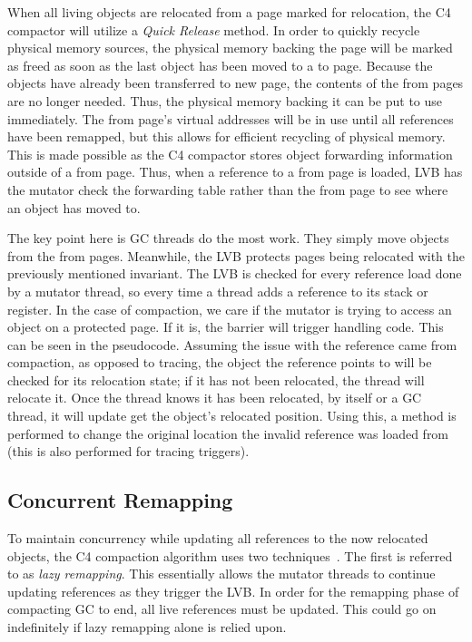 \documentclass{sig-alternate}
\begin{document}
When all living objects are relocated from a page marked for relocation,
the C4 compactor will utilize a \emph{Quick Release} method. In order to quickly recycle
physical memory sources, the physical memory backing the page will be marked as freed
as soon as the last object has been moved to a to page. Because the objects have already 
been transferred to new page, the contents of the from pages are no longer needed. Thus,
the physical memory backing it can be put to use immediately. The from page's virtual 
addresses will be in use until all references have been remapped, but this 
allows for efficient recycling of physical memory. This is made possible as the C4 compactor
stores object forwarding information outside of a from page. Thus, when a reference to
a from page is loaded, LVB has the mutator check the forwarding table rather than the
from page to see where an object has moved to.

The key point here is GC threads do the most work. They simply
move objects from the from pages. Meanwhile, the LVB protects pages being 
relocated with the previously mentioned invariant. The LVB is checked for every reference load
done by a mutator thread, so every time a thread adds a reference to its 
stack or register. In the case of compaction, we care if the mutator is trying 
to access an object on a protected page. If it is, the barrier will trigger 
handling code. This can be seen in the pseudocode. Assuming the issue with the
reference came from compaction, as opposed to tracing, the object the reference
points to will be checked for its relocation state; if it has not been relocated, the
thread will relocate it. Once the thread knows it has been relocated, by itself
or a GC thread, it will update get the object's relocated position. Using this,
a method is performed to change the original location
the invalid reference was loaded from (this is also performed for tracing triggers).



\subsection{Concurrent Remapping}
\label{sec:c4Remapping}

To maintain concurrency while updating all references to the now relocated
objects, the C4 compaction algorithm uses two techniques~\cite{Tene:C4}. The first is
referred to as \emph{lazy remapping}. This essentially allows the mutator
threads to continue updating references as they trigger the LVB. In order for
the remapping phase of compacting GC to end, all live references must be updated.
This could go on indefinitely if lazy remapping alone is relied upon.
\end{document}
